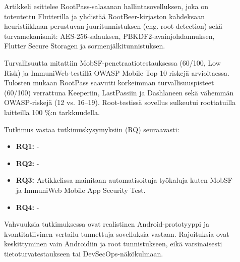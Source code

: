 \documentclass[bscthesis,finnish,oneside,biblatex]{uefcsthesis}
\begin{document}
\begin{description}
    \item[\cite{mukti2023_passwordmanager}] Artikkeli esittelee RootPass-salasanan hallintasovelluksen, joka on toteutettu Flutterilla ja yhdistää RootBeer-kirjaston kahdeksaan heuristiikkaan perustuvan juuritunnistuksen (eng. root detection) sekä turvamekanismit: AES-256-salauksen, PBKDF2-avainjohdannuksen, Flutter Secure Storagen ja sormenjälkitunnistuksen.

    Turvallisuutta mitattiin MobSF-penetraatiotestauksessa (60/100, Low Risk) ja ImmuniWeb-testillä OWASP Mobile Top 10 riskejä arvioitaessa. Tulosten mukaan RootPass saavutti korkeimman turvallisuuspisteet (60/100) verrattuna Keeperiin, LastPassiin ja Dashlaneen sekä vähemmän OWASP-riskejä (12 vs. 16–19). Root-testissä sovellus sulkeutui roottatuilla laitteilla 100 \%:n tarkkuudella.

    Tutkimus vastaa tutkimuskysymyksiin (RQ) seuraavasti:
    \begin{itemize}
        \item \textbf{RQ1:} -
        \item \textbf{RQ2:} -
        \item \textbf{RQ3:} Artikkelissa mainitaan automatisoituja työkaluja kuten MobSF ja ImmuniWeb Mobile App Security Test.
        \item \textbf{RQ4:} -
    \end{itemize}

     Vahvuuksia tutkimuksessa ovat realistinen Android-prototyyppi ja kvantitatiivinen vertailu tunnettuja sovelluksia vastaan. Rajoituksia ovat keskittyminen vain Androidiin ja root tunnistukseen, eikä varsinaisesti tietoturvatestaukseen tai DevSecOps-näkökulmaan.
\end{description}
\end{document}
